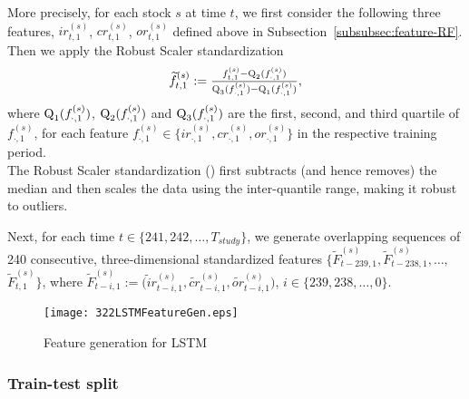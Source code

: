 \documentclass[review]{elsarticle}
\begin{document}
More precisely, for each stock $s$ at time $t$, we first consider the following three features, $ir^{(s)}_{t,1}$, $cr^{(s)}_{t,1}$, $or^{(s)}_{t,1}$ defined above in Subsection~\ref{subsubsec:feature-RF}. Then we apply the Robust Scaler standardization 
\begin{equation*}
\widetilde{f}^{(s)}_{t,1}:= \tfrac{{f}^{(s)}_{t,1} - \textup{Q}_2({f}^{(s)}_{\cdot,1})}{\textup{Q}_3({f}^{(s)}_{\cdot,1})-\textup{Q}_1({f}^{(s)}_{\cdot,1})},
\end{equation*}
where $\textup{Q}_1({f}^{(s)}_{\cdot,1})$, $\textup{Q}_2({f}^{(s)}_{\cdot,1})$ and $\textup{Q}_3({f}^{(s)}_{\cdot,1})$ are the first, second, and third quartile of ${f}^{(s)}_{\cdot,1}$, 
for each feature ${f}^{(s)}_{\cdot,1} \in \big\{ir^{(s)}_{\cdot,1}, cr^{(s)}_{\cdot,1},or^{(s)}_{\cdot,1}\big\}$ in the respective training period.
\\
The Robust Scaler standardization (\cite{pedregosa2011scikit}) first subtracts (and hence removes) the median and then scales the data using the inter-quantile range, making it robust to  outliers.

Next, for each time $t\in \{241,242,\dots,T_{study}\}$, we generate overlapping sequences  of  240  consecutive, three-dimensional standardized features $\big\{\widetilde{F}^{(s)}_{t-239,1}, \widetilde{F}^{(s)}_{t-238,1}, \dots,$ $ \widetilde{F}^{(s)}_{t,1}\big\}$, where 
$\widetilde{F}^{(s)}_{t-i,1}:=\big(\widetilde ir^{(s)}_{t-i,1},\widetilde{cr}^{(s)}_{t-i,1},\widetilde{or}^{(s)}_{t-i,1}\big)$, $i\in \{239,238,\dots,0\}$.
\begin{figure}[H]
	\centering
	\texttt{[image: 322LSTMFeatureGen.eps]}
\hfill
	\caption{Feature  generation for LSTM}
	\label{fig:figure3.2.2.featureGenRandomLSTM}
\end{figure}



\subsubsection{Train-test split}
\end{document}
